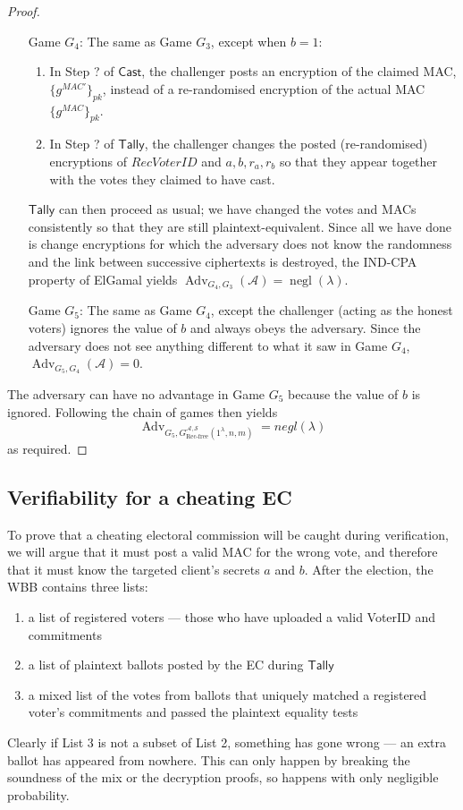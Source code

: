 \documentclass[12pt,a4paper]{article}
\DeclareMathOperator{\negl}{\text{negl}}
\DeclareMathOperator{\Adv}{\text{Adv}}
\theoremstyle{definition}
\newcommand{\receivedvid}{\mathit{RecVoterID}}
\newcommand{\Mac}{\mathit{MAC}}
\begin{document}
\begin{proof}
\begin{itemize}[leftmargin=4em]
        \item[Game] $G_4$: The same as Game $G_3$, except when $b = 1$:
        \begin{enumerate}
            \item In Step ? of $\mathsf{Cast}$, the challenger posts an encryption of the claimed MAC, $\{g^{\Mac'}\}_{pk}$, instead of a re-randomised encryption of the actual MAC $\{g^\Mac\}_{pk}$.
            \item In Step ? of $\mathsf{Tally}$, the challenger changes the posted (re-randomised) encryptions of $\receivedvid$ and $a, b, r_a, r_b$ so that they appear together with the votes they claimed to have cast.
        \end{enumerate}
        $\mathsf{Tally}$ can then proceed as usual; we have changed the votes and MACs consistently so that they are still plaintext-equivalent. Since all we have done is change encryptions for which the adversary does not know the randomness and the link between successive ciphertexts is destroyed, the IND-CPA property of ElGamal yields $\Adv_{G_4, G_3}(\mathcal{A})=\negl(\lambda)$.
    
        \item[Game] $G_5$: The same as Game $G_4$, except the challenger (acting as the honest voters) ignores the value of $b$ and always obeys the adversary. Since the adversary does not see anything different to what it saw in Game $G_4$, $\Adv_{G_5, G_4}(\mathcal{A})=0$.
    \end{itemize}
    The adversary can have no advantage in Game $G_5$ because the value of $b$ is ignored. Following the chain of games then yields
        $$\Adv_{G_5, G^{\mathcal{A},\mathcal{S}}_\text{Rec-free}(1^\lambda,n,m)}=negl(\lambda)$$
    as required.
\end{proof}

\subsection{Verifiability for a cheating EC}
To prove that a cheating electoral commission will be caught during verification, we will argue that it must post a valid MAC for the wrong vote, and therefore that it must know the targeted client's secrets $a$ and $b$. After the election, the WBB contains three lists:
\begin{enumerate}
    \item a list of registered voters --- those who have uploaded a valid VoterID and commitments
    \item a list of plaintext ballots posted by the EC during $\mathsf{Tally}$
    \item a mixed list of the votes from ballots that uniquely matched a registered voter's commitments and passed the plaintext equality tests
\end{enumerate}
Clearly if List 3 is not a subset of List 2, something has gone wrong --- an extra ballot has appeared from nowhere. This can only happen by breaking the soundness of the mix or the decryption proofs, so happens with only negligible probability.
\end{document}
